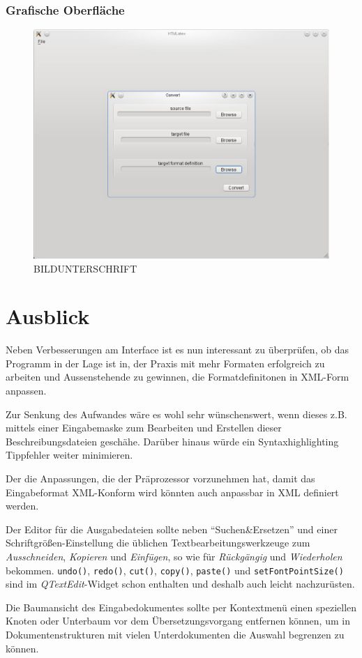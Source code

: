 \documentclass[	a4paper,		%
		titlepage, 		%
		fontsize=12pt		%
		]{scrartcl} 		%
\begin{document}
\subsubsection{Grafische Oberfläche}
\begin{figure} [H]
    \centering
	\includegraphics[width=.5\textwidth, keepaspectratio]{./img/screenshot.eps}
    \caption{BILDUNTERSCHRIFT}
\end{figure}

\section{Ausblick}
Neben Verbesserungen am Interface ist es nun interessant zu überprüfen, ob das Programm in der Lage ist in, der Praxis mit mehr Formaten erfolgreich zu arbeiten und Aussenstehende zu gewinnen, die Formatdefinitonen in XML-Form anpassen.

Zur Senkung des Aufwandes wäre es wohl sehr wünschenswert, wenn dieses z.B. mittels einer Eingabemaske zum Bearbeiten und Erstellen dieser Beschreibungsdateien geschähe. Darüber hinaus würde ein Syntaxhighlighting Tippfehler weiter minimieren.

Der die Anpassungen, die der Präprozessor vorzunehmen hat, damit das Eingabeformat XML-Konform wird könnten auch anpassbar in XML definiert werden.

Der Editor für die Ausgabedateien sollte neben ``Suchen\&Ersetzen'' und einer Schriftgrößen-Einstellung die üblichen Textbearbeitungswerkzeuge zum \emph{Ausschneiden}, \emph{Kopieren} und \emph{Einfügen}, so wie für \emph{Rückgängig}  und \emph{Wiederholen} bekommen. \texttt{undo()}, \texttt{redo()}, \texttt{cut()}, \texttt{copy()}, \texttt{paste()} und \texttt{setFontPointSize()} sind im \emph{QTextEdit}-Widget schon enthalten und deshalb auch leicht nachzurüsten.

Die Baumansicht des Eingabedokumentes sollte per Kontextmenü einen speziellen Knoten oder Unterbaum vor dem Übersetzungsvorgang entfernen können, um in Dokumentenstrukturen mit vielen Unterdokumenten die Auswahl begrenzen zu können.
\end{document}
